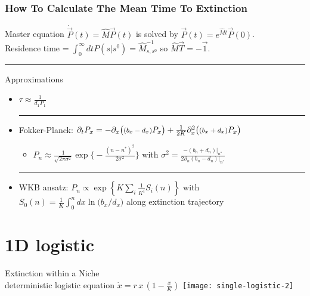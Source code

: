 \documentclass[dvipsnames]{beamer}
\begin{document}
\begin{frame}
\frametitle{How To Calculate The Mean Time To Extinction}
Master equation $\dot{\vec{P}}(t) = \hat{M}\vec{P}(t)$ is solved by $\vec{P}(t)=e^{\hat{M}t}\vec{P}(0)$. \\ %
\pause
\large{
	Residence time = $\int_0^{\infty} dt P(s|s^0)=\hat{M}^{-1}_{s,s^0}$ so $\boxed{\hat{M}\vec{T}=-\vec{1}}$. \\%
}
\pause
\noindent\rule{10cm}{0.4pt}
\large{Approximations}
\begin{itemize}
	\item $\tau \approx \frac{1}{d_1 P_1}$
	\pause
	\\ \noindent\rule{3cm}{0.4pt}
	\item Fokker-Planck: $\partial_t P_x = - \partial_x\big(\text{\footnotesize{$(b_x - d_x)$}} P_x \big) + \frac{1}{2 K} \partial_x^2 \big(\text{\footnotesize{$(b_x + d_x)$}} P_x \big)$
	\begin{itemize}
		\item $P_n \approx \frac{1}{\sqrt{2\pi\sigma^{2}}}\exp\Big\lbrace-\frac{(n-n^*)^2}{2\sigma^{2}}\Big\rbrace$ with $\sigma^2=\frac{-(b_n + d_n)|_{n^*}}{2\partial_n(b_n - d_n)|_{n^*}}$
	\end{itemize}
	\pause
	\noindent\rule{9.5cm}{0.4pt}
	\item WKB ansatz: $P_n \propto \exp \left\{ K \sum_i \frac{1}{K^i}S_i(n) \right\}$ with\\
	$S_0(n) = \frac{1}{K}\int_{0}^{n} dx \ln\big(b_x/d_x\big)$ along extinction trajectory
\end{itemize}
\end{frame}



\section[Extinction]{1D logistic}

\begin{frame}
\centering
{{\Huge Extinction within a Niche\\}}
\normalsize{}
\vspace{1cm}
deterministic logistic equation $\dot{x} = r \, x \, \left(1-\frac{x}{K}\right)$
\texttt{[image: single-logistic-2]}
\end{frame}
\end{document}
